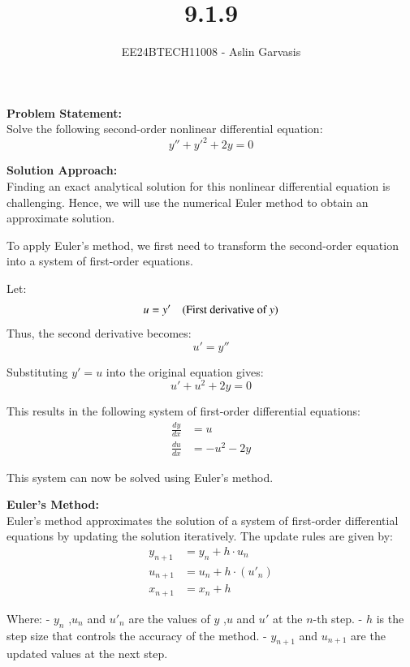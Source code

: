 \documentclass[journal]{IEEEtran}
\begin{document}
\title{9.1.9}
\author{EE24BTECH11008 - Aslin Garvasis}
\maketitle

\textbf{Problem Statement:}\\
Solve the following second-order nonlinear differential equation:
\begin{equation}
y'' + y'^2 + 2y = 0
\end{equation}

\textbf{Solution Approach:}\\
Finding an exact analytical solution for this nonlinear differential equation is challenging. Hence, we will use the numerical Euler method to obtain an approximate solution.

To apply Euler’s method, we first need to transform the second-order equation into a system of first-order equations.

Let:
\[
u = y' \quad \text{(First derivative of \( y \))}
\]
Thus, the second derivative becomes:
\[
u' = y''
\]

Substituting \( y' = u \) into the original equation gives:
\begin{equation}
u' + u^2 + 2y = 0
\end{equation}

This results in the following system of first-order differential equations:
\begin{align}
\frac{dy}{dx} &= u \\
\frac{du}{dx} &= -u^2 - 2y
\end{align}

This system can now be solved using Euler's method.

\textbf{Euler’s Method:}\\
Euler's method approximates the solution of a system of first-order differential equations by updating the solution iteratively. The update rules are given by:
\begin{align}
y_{n+1} &= y_n + h \cdot u_n \\
u_{n+1} &= u_n + h \cdot (u'_n) \\
x_{n+1} &= x_n + h
\end{align}

Where:
- \( y_n \) ,\( u_n \) and \( u'_n \) are the values of \( y \) ,\( u \) and \( u' \) at the \( n \)-th step.
- \( h \) is the step size that controls the accuracy of the method.
- \( y_{n+1} \) and \( u_{n+1} \) are the updated values at the next step.
\end{document}
